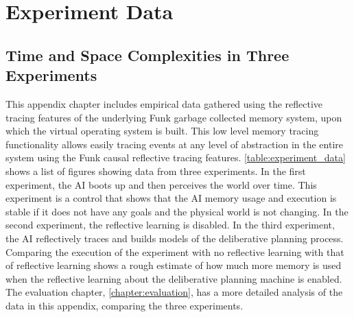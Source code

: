 \chapter{Experiment Data}
\label{chapter:experiment_data}

\section{Time and Space Complexities in Three Experiments}

This appendix chapter includes empirical data gathered using the
reflective tracing features of the underlying Funk garbage collected
memory system, upon which the virtual operating system is built.  This
low level memory tracing functionality allows easily tracing events at
any level of abstraction in the entire system using the Funk causal
reflective tracing features.  \autoref{table:experiment_data} shows a
list of figures showing data from three experiments.  In the first
experiment, the AI boots up and then perceives the world over time.
This experiment is a control that shows that the AI memory usage and
execution is stable if it does not have any goals and the physical
world is not changing.  In the second experiment, the reflective
learning is disabled.  In the third experiment, the AI reflectively
traces and builds models of the deliberative planning process.
Comparing the execution of the experiment with no reflective learning
with that of reflective learning shows a rough estimate of how much
more memory is used when the reflective learning about the
deliberative planning machine is enabled.  The evaluation chapter,
\autoref{chapter:evaluation}, has a more detailed analysis of the data
in this appendix, comparing the three experiments.

